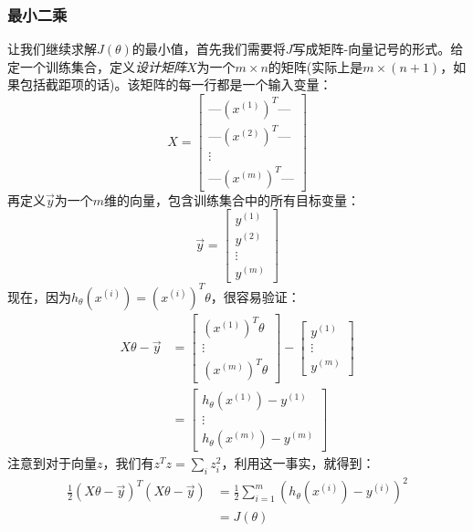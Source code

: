 \documentclass[hyperref, UTF8]{ctexart}
\begin{document}
\subsubsection{最小二乘}
让我们继续求解$J(\theta)$的最小值，首先我们需要将$J$写成矩阵-向量记号的形式。给定一个训练集合，定义\emph{设计矩阵}$X$为一个$m \times n$的矩阵(实际上是$m \times (n + 1)$，如果包括截距项的话)。该矩阵的每一行都是一个输入变量：
\begin{equation*}
X =
\begin{bmatrix}
\text{---} (x^{(1)})^T \text{---} \\
\text{---} (x^{(2)})^T \text{---} \\
\vdots \\
\text{---} (x^{(m)})^T \text{---}
\end{bmatrix}
\end{equation*}
再定义$\vec{y}$为一个$m$维的向量，包含训练集合中的所有目标变量：
\begin{equation*}
\vec{y} =
\begin{bmatrix}
y^{(1)} \\
y^{(2)} \\
\vdots \\
y^{(m)}
\end{bmatrix}
\end{equation*}
现在，因为$h_\theta(x^{(i)}) = (x^{(i)})^T\theta$，很容易验证：
\begin{equation*}
\begin{split}
X\theta - \vec{y} &=
\begin{bmatrix}
(x^{(1)})^T\theta \\
\vdots \\
(x^{(m)})^T\theta
\end{bmatrix}
-
\begin{bmatrix}
y^{(1)} \\
\vdots \\
y^{(m)}
\end{bmatrix} \\
&=
\begin{bmatrix}
h_\theta(x^{(1)}) - y^{(1)} \\
\vdots \\
h_\theta(x^{(m)}) - y^{(m)} 
\end{bmatrix}
\end{split}
\end{equation*}
注意到对于向量$z$，我们有$z^Tz = \sum_iz^2_i$，利用这一事实，就得到：
\begin{equation*}
\begin{split}
\frac{1}{2}(X\theta - \vec{y})^T(X\theta - \vec{y}) &= \frac{1}{2}\sum_{i = 1}^m(h_\theta(x^{(i)}) - y^{(i)})^2 \\
&= J(\theta)
\end{split}
\end{equation*}
\end{document}
